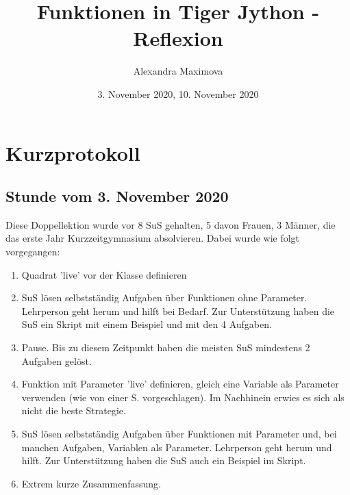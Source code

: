 \documentclass{article}
\title{Funktionen in Tiger Jython - Reflexion}
\author{Alexandra Maximova}
\date{3. November 2020, 10. November 2020}
\begin{document}
\maketitle
\section*{Kurzprotokoll}

\subsection*{Stunde vom 3. November 2020}
Diese Doppellektion wurde vor 8 SuS gehalten, 5 davon Frauen, 3 Männer, die das erste Jahr Kurzzeitgymnasium absolvieren. Dabei wurde wie folgt vorgegangen:
\begin{enumerate}
\item Quadrat 'live' vor der Klasse definieren
\item SuS lösen selbstständig Aufgaben über Funktionen ohne Parameter.  Lehrperson geht herum und hilft bei Bedarf. Zur Unterstützung haben die SuS ein Skript mit einem Beispiel und mit den 4 Aufgaben.
\item Pause. Bis zu diesem Zeitpunkt haben die meisten SuS mindestens 2 Aufgaben gelöst.
\item Funktion mit Parameter 'live' definieren, gleich eine Variable als Parameter verwenden (wie von einer S. vorgeschlagen). Im Nachhinein erwies es sich als nicht die beste Strategie.
\item SuS lösen selbstständig Aufgaben über Funktionen mit Parameter und, bei manchen Aufgaben, Variablen als Parameter. Lehrperson geht herum und hilft. Zur Unterstützung haben die SuS auch ein Beispiel im Skript.
\item Extrem kurze Zusammenfassung.
\end{enumerate}
\end{document}
